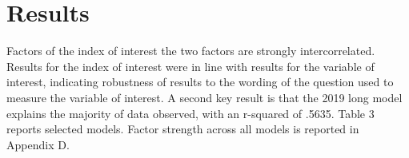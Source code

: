 \documentclass[AER]{./aea-latex-templates/AEA}
\begin{document}
        \section{Results}
        
        Factors of the index of interest the two factors
        are strongly intercorrelated. Results for the index of interest were in line
        with results for the variable of interest, indicating robustness of results
        to the wording of the question used to measure the variable of interest.
        A second key result is that the 2019 long model explains the majority of data observed, with an r-squared of .5635.
        Table 3 reports selected models. Factor strength across all models is reported in Appendix D.
        
\end{document}
